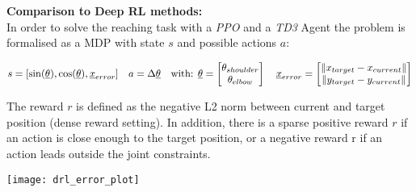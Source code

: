 \documentclass[portrait,final,a0paper,fontscale=0.39]{baposter}
\begin{document}
\begin{poster}
{\begin{adjustbox}{minipage=0.95\textwidth, margin=5pt, center}
\begin{minipage}[t]{0.25\textwidth}
\begin{center}
			\end{center}
		\end{minipage}
		\hfill
		\begin{minipage}[t]{0.725\textwidth}
			\vspace{8pt}
			\textbf{Comparison to Deep RL methods:}\\[2pt]
			In order to solve the reaching task with a \textit{PPO} \parencite{schulmanProximalPolicyOptimization2017} and a \textit{TD3} Agent \parencite{fujimoto2018addressing} the problem is formalised as a MDP with state $s$ and possible actions $a$:\\[-8pt]
			\begin{center}
				$s = [\sin(\underline{\theta}),  \cos(\underline{\theta}), \underline{x}_{error}] \hspace{10pt} a = \Delta\underline{\theta}\hspace{10pt} \text{with:  } \underline{\theta}=\begin{bmatrix}
					\theta_{shoulder} \\
					\theta_{elbow} \\ 
				\end{bmatrix} \hspace{10pt} 
				\underline{x}_{error}=\begin{bmatrix}
					\left\lVert x_{target} - x_{current} \right\rVert \\
					\left\lVert y_{target} - y_{current} \right\rVert \\ 
				\end{bmatrix}  \vspace{5pt}
				$
			\end{center}
			The reward $r$ is defined as the negative L2 norm between current and target position (dense reward setting). In addition, there is a sparse positive reward $r$ if an action is close enough to the target position, or a negative reward r if an action leads outside the joint constraints.\\[5pt]
			\begin{center}
				\texttt{[image: drl\_error\_plot]}
			\end{center}
		\end{minipage}
		\hfill
	\end{adjustbox}

}


\end{poster}
\end{document}
